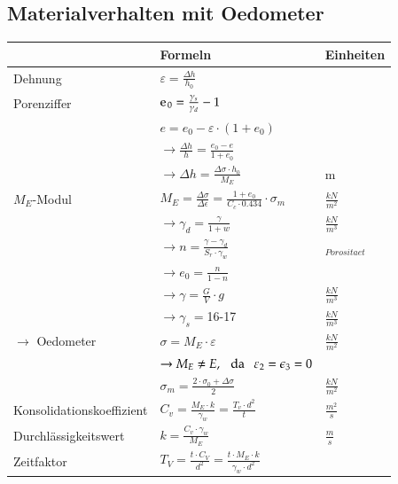 \begin{minipage}[t]{0.5\linewidth}
	\subsection{Materialverhalten mit Oedometer}

	\begin{tabular}{l|l|l}
				& Formeln 									& Einheiten \\ \hline \hline
	
		Dehnung &$\varepsilon = \frac{\Delta h}{h_0}$& \\ \hline
	
		Porenziffer&$\e_0=\frac{\gamma_s}{\gamma_d} -1$		& \\
				&$e=e_0-\varepsilon \cdot \left(1+ e_0\right)$	&\\
				&$\rightarrow\frac{\Delta h}{h}=\frac{e_0 - e}{1+e_0}$&\\	
				&$\rightarrow\Delta h=\frac{\Delta \sigma \cdot h_0}{M_E}$&m \\ \hline
	
		$M_E$-Modul&$M_E=\frac{\Delta \sigma}{\Delta \epsilon}=\frac{1+e_0}{C_c \cdot 0.434}\cdot\sigma_m$&$\frac{kN}{m^2}$ \\	
				&$\rightarrow \gamma_d=\frac{\gamma}{1+w}$	&$\frac{kN}{m^3}$ \\
				&$\rightarrow n=\frac{\gamma-\gamma_d}{S_r\cdot\gamma_w}$&  $_{Porositaet}$ \\
				&$\rightarrow e_0=\frac{n}{1-n}$			& \\
				&$\rightarrow \gamma=\frac{G}{V}\cdot g$	& $\frac{kN}{m^3}$ \\
				&$\rightarrow \gamma_s=$16-17				& $\frac{kN}{m^3}$ \\ \hline

		$\rightarrow$ Oedometer&$\sigma=M_E \cdot \varepsilon$ &$\frac{kN}{m^2}$ \\
				&$\rightarrow M_E\neq E, \hspace{0.25cm}\text{da} \hspace{.25cm} \varepsilon_2=\epsilon_3=0$& \\
				&$\sigma_m=\frac{2\cdot\sigma_0+\Delta \sigma}{2}$&$\frac{kN}{m^2}$ \\ \hline

		Konsolidationskoeffizient&$C_v=\frac{M_E\cdot k}{\gamma_w}=\frac{T_v\cdot d^2}{t}$&$\frac{m^2}{s}$ \\ \hline

		Durchlässigkeitswert&$k=\frac{C_v\cdot\gamma_w}{M_E}$& $\frac{m}{s}$ \\ \hline
		Zeitfaktor&$T_V=\frac{t\cdot C_V}{d^2}=\frac{t\cdot M_E\cdot k}{\gamma_w\cdot d^2}$& \\ \hline
	

\end{tabular}
\end{minipage}
